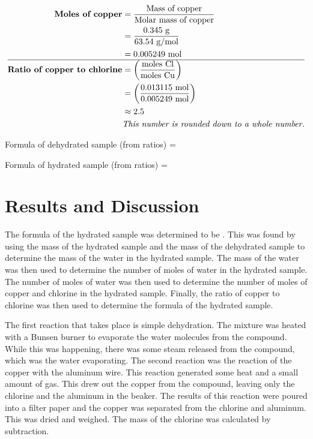 \documentclass[12pt]{article}
\begin{document}
\begin{equation*}
    \begin{split}
        \text{\textbf{Moles of copper}} & = \frac{\text{Mass of copper}}{\text{Molar mass of copper}} \\
        & = \frac{0.345 \text{ g}}{63.54 \text{ g/mol}} \\
        & = 0.005249 \text{ mol} \\
        \hline
        \text{\textbf{Ratio of copper to chlorine}} & = \left(\frac{\text{moles Cl}}{\text{moles Cu}}\right) \\
        & = \left(\frac{0.013115 \text{ mol}}{0.005249 \text{ mol}}\right) \\
        & \approx 2.5 \\
        & \text{\textit{This number is rounded down to a whole number.}}
    \end{split}
\end{equation*}

Formula of dehydrated sample (from ratios) = 

Formula of hydrated sample (from ratios) = 

\clearpage

\section*{Results and Discussion}

The formula of the hydrated sample was determined to be . This was found by
using the mass of the hydrated sample and the mass of the dehydrated sample to determine the
mass of the water in the hydrated sample. The mass of the water was then used to determine the
number of moles of water in the hydrated sample. The number of moles of water was then used to
determine the number of moles of copper and chlorine in the hydrated sample. Finally, the ratio
of copper to chlorine was then used to determine the formula of the hydrated sample.

The first reaction that takes place is simple dehydration. The mixture was heated with a Bunsen
burner to evaporate the water molecules from the compound. While this was happening, there was
some steam released from the compound, which was the water evaporating. The second reaction was
the reaction of the copper with the aluminum wire. This reaction generated some heat and a small
amount of  gas. This drew out the copper from the compound, leaving only the chlorine and
the aluminum in the beaker. The results of this reaction were poured into a filter paper and the
copper was separated from the chlorine and aluminum. This was dried and weighed. The mass of the
chlorine was calculated by subtraction.
\end{document}
